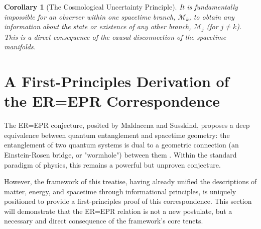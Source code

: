 \documentclass[11pt, letterpaper]{report}
\theoremstyle{plain} %
\newtheorem{corollary}[theorem]{Corollary}
\theoremstyle{definition} %
\theoremstyle{remark} %
\begin{document}
\begin{corollary}[The Cosmological Uncertainty Principle]
It is fundamentally impossible for an observer within one spacetime branch, $\mathcal{M}_k$, to obtain any information about the state or existence of any other branch, $\mathcal{M}_j$ (for $j \neq k$). This is a direct consequence of the causal disconnection of the spacetime manifolds.
\end{corollary}



\section{A First-Principles Derivation of the ER=EPR Correspondence}
\label{sec:er_epr_derivation}

The ER=EPR conjecture, posited by Maldacena and Susskind, proposes a deep equivalence between quantum entanglement and spacetime geometry: the entanglement of two quantum systems is dual to a geometric connection (an Einstein-Rosen bridge, or "wormhole") between them \cite{Maldacena2013Cool}. Within the standard paradigm of physics, this remains a powerful but unproven conjecture.

However, the framework of this treatise, having already unified the descriptions of matter, energy, and spacetime through informational principles, is uniquely positioned to provide a first-principles proof of this correspondence. This section will demonstrate that the ER=EPR relation is not a new postulate, but a necessary and direct consequence of the framework's core tenets.
\end{document}
